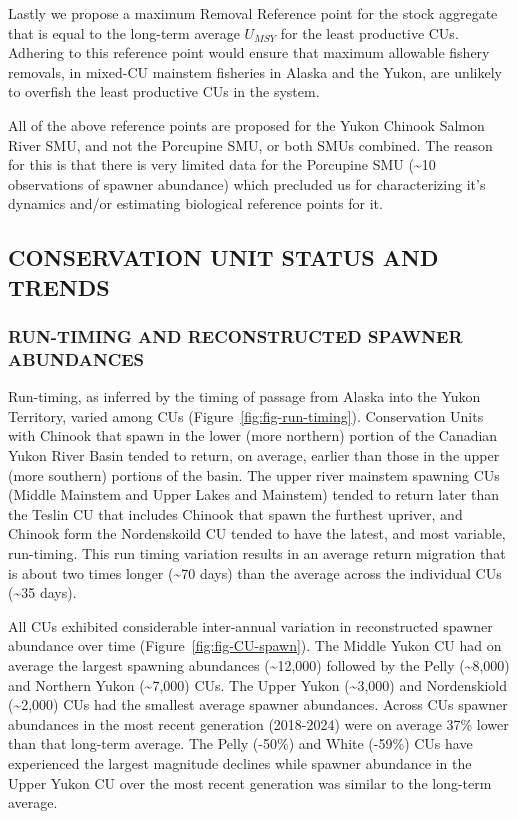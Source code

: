 \documentclass[11pt]{book}
\begin{document}
Lastly we propose a maximum Removal Reference point for the stock aggregate that is equal to the long-term average \(U_{MSY}\) for the least productive CUs. Adhering to this reference point would ensure that maximum allowable fishery removals, in mixed-CU mainstem fisheries in Alaska and the Yukon, are unlikely to overfish the least productive CUs in the system.

All of the above reference points are proposed for the Yukon Chinook Salmon River SMU, and not the Porcupine SMU, or both SMUs combined. The reason for this is that there is very limited data for the Porcupine SMU (\textasciitilde10 observations of spawner abundance) which precluded us for characterizing it's dynamics and/or estimating biological reference points for it.

\hypertarget{conservation-unit-status-and-trends}{%
\subsection{CONSERVATION UNIT STATUS AND TRENDS}\label{conservation-unit-status-and-trends}}

\hypertarget{run-timing-and-reconstructed-spawner-abundances}{%
\subsubsection{RUN-TIMING AND RECONSTRUCTED SPAWNER ABUNDANCES}\label{run-timing-and-reconstructed-spawner-abundances}}

Run-timing, as inferred by the timing of passage from Alaska into the Yukon Territory, varied among CUs (Figure~\ref{fig:fig-run-timing}). Conservation Units with Chinook that spawn in the lower (more northern) portion of the Canadian Yukon River Basin tended to return, on average, earlier than those in the upper (more southern) portions of the basin. The upper river mainstem spawning CUs (Middle Mainstem and Upper Lakes and Mainstem) tended to return later than the Teslin CU that includes Chinook that spawn the furthest upriver, and Chinook form the Nordenskoild CU tended to have the latest, and most variable, run-timing. This run timing variation results in an average return migration that is about two times longer (\textasciitilde70 days) than the average across the individual CUs (\textasciitilde35 days).

All CUs exhibited considerable inter-annual variation in reconstructed spawner abundance over time (Figure~\ref{fig:fig-CU-spawn}). The Middle Yukon CU had on average the largest spawning abundances (\textasciitilde12,000) followed by the Pelly (\textasciitilde8,000) and Northern Yukon (\textasciitilde7,000) CUs. The Upper Yukon (\textasciitilde3,000) and Nordenskiold (\textasciitilde2,000) CUs had the smallest average spawner abundances. Across CUs spawner abundances in the most recent generation (2018-2024) were on average 37\% lower than that long-term average. The Pelly (-50\%) and White (-59\%) CUs have experienced the largest magnitude declines while spawner abundance in the Upper Yukon CU over the most recent generation was similar to the long-term average.
\end{document}
